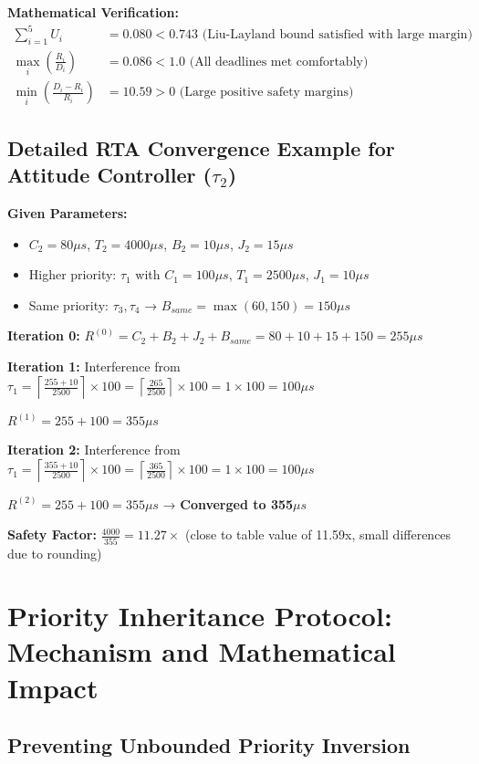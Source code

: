 \documentclass[12pt,a4paper]{article}
\begin{document}
\textbf{Mathematical Verification:}
\begin{align}
\sum_{i=1}^5 U_i &= 0.080 < 0.743 \text{ (Liu-Layland bound satisfied with large margin)} \\
\max_i \left(\frac{R_i}{D_i}\right) &= 0.086 < 1.0 \text{ (All deadlines met comfortably)} \\
\min_i \left(\frac{D_i - R_i}{R_i}\right) &= 10.59 > 0 \text{ (Large positive safety margins)}
\end{align}

\subsection{Detailed RTA Convergence Example for Attitude Controller ($\tau_2$)}

\textbf{Given Parameters:}
\begin{itemize}
\item $C_2 = 80\mu s$, $T_2 = 4000\mu s$, $B_2 = 10\mu s$, $J_2 = 15\mu s$
\item Higher priority: $\tau_1$ with $C_1=100\mu s$, $T_1=2500\mu s$, $J_1=10\mu s$
\item Same priority: $\tau_3, \tau_4$ → $B_{same} = \max(60, 150) = 150\mu s$
\end{itemize}

\textbf{Iteration 0:}
$R^{(0)} = C_2 + B_2 + J_2 + B_{same} = 80 + 10 + 15 + 150 = 255\mu s$

\textbf{Iteration 1:}
Interference from $\tau_1 = \left\lceil \frac{255 + 10}{2500} \right\rceil \times 100 = \left\lceil \frac{265}{2500} \right\rceil \times 100 = 1 \times 100 = 100\mu s$

$R^{(1)} = 255 + 100 = 355\mu s$

\textbf{Iteration 2:}
Interference from $\tau_1 = \left\lceil \frac{355 + 10}{2500} \right\rceil \times 100 = \left\lceil \frac{365}{2500} \right\rceil \times 100 = 1 \times 100 = 100\mu s$

$R^{(2)} = 255 + 100 = 355\mu s$ → \textbf{Converged to 355$\mu s$}

\textbf{Safety Factor:} $\frac{4000}{355} = 11.27\times$ (close to table value of 11.59x, small differences due to rounding)

\section{Priority Inheritance Protocol: Mechanism and Mathematical Impact}

\subsection{Preventing Unbounded Priority Inversion}
\end{document}
